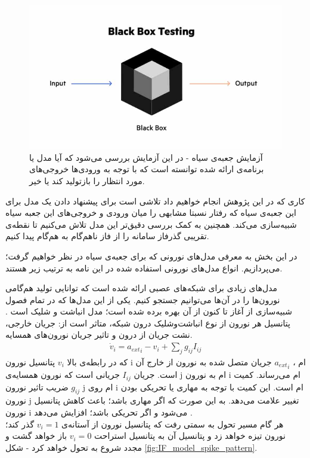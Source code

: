 \begin{figure}
	\centering
	\includegraphics[width=\textwidth]{../Figures/Black_box_test.jpg}
	\caption{
		آزمایش جعبه‌ی سیاه - در این آزمایش بررسی می‌شود که آیا مدل یا برنامه‌ی ارائه شده توانسته است که با توجه به ورودی‌ها خروجی‌های مورد انتظار را بازتولید کند یا خیر.}
	\label{fig:black_box}
\end{figure}

  کاری که در این پژوهش انجام خواهیم داد تلاشی است برای پیشنهاد دادن یک مدل برای این جعبه‌ی سیاه که رفتار نسبتا مشابهی را میان ورودی و خروجی‌های این جعبه سیاه شبیه‌سازی می‌کند. همچنین به کمک بررسی دقیق‌تر این مدل تلاش می‌کنیم تا نقطه‌ی تقریبی گذرفاز سامانه را از فاز ناهم‌گام به هم‌گام پیدا کنیم.

در این بخش به معرفی مدل‌های نورونی که برای جعبه‌ی سیاه در نظر خواهیم گرفت؛ می‌پردازیم. انواع مدل‌های نورونی استفاده شده در این نامه به ترتیب زیر هستند.

مدل‌های زیادی برای شبکه‌های عصبی ارائه شده است که توانایی تولید هم‌گامی نورون‌ها را در آن‌ها می‌توانیم جستجو کنیم. یکی از این مدل‌ها که در تمام فصول شبیه‌سازی از آغاز تا کنون از آن بهره برده شده است؛ مدل انباشت و شلیک است
\cite{lapicque:jppg1907}
\cite{brunel2007quantitative}. 
پتانسیل هر نورون از نوع انباشت‌وشلیک درون شبکه، متاثر است از: جریان خارجی، نشت جریان از درون و تاثیر جریان نورون‌های همسایه.
\begin{align}
	\dot{v}_i = {a_{ext}}_i - v_i + \sum_j g_{ij} I_{ij}
\end{align}
که در رابطه‌ی بالا 
$v_i$
پتانسیل نورون i ام ،
${a_{ext}}_i$
جریان متصل شده به نورون از خارج آن است. جریان
$I_{ij}$
جریانی است که نورون همسایه‌ی j ام به نورون i ام می‌رساند. کمیت
$g_{ij}$
ضریب تاثیر نورون j ام روی i ام است. این کمیت با توجه به مهاری یا تحریکی بودن نورون j تغییر علامت می‌دهد. به این صورت که اگر مهاری باشد؛ باعث کاهش پتانسیل نورون i می‌شود و اگر تحریکی باشد؛ افزایش می‌دهد
\cite{Erö2018}.\\
هر گام مسیر تحول به سمتی رفت که پتانسیل نورون از آستانه‌ی 
$v_i = 1$
گذر کند؛ نورون تیزه خواهد زد و پتانسیل آن به پتانسیل استراحت
$v_i = 0$
باز خواهد گشت و مجدد شروع به تحول خواهد کرد - شکل
\ref{fig:IF_model_spike_pattern}.

